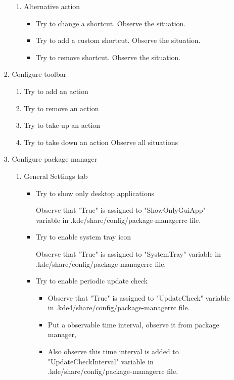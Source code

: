\documentclass[a4paper,10pt]{article}
\begin{document}
\begin{enumerate}
\begin{enumerate}
\begin{enumerate}
\begin{enumerate}
                \item Alternative action
                \begin{itemize}
                    \item Try to change a shortcut. Observe the situation.
                    \item Try to add a custom shortcut. Observe the situation.
                    \item Try to remove shortcut. Observe the situation.
                \end{itemize}
            \end{enumerate}
            \item Configure toolbar
            \begin{enumerate}
                \item Try to add an action 
                \item Try to remove an action
                \item Try to take up an action
                \item Try to take down an action
                Observe all situations
            \end{enumerate}
            \item Configure package manager
            \begin{enumerate}
                \item General Settings tab
                \begin{itemize}
                    \item Try to show only desktop applications

                    Observe that "True" is assigned to "ShowOnlyGuiApp" variable in .kde/share/config/package-managerrc file.

                    \item Try to enable system tray icon

                    Observe that "True" is assigned to "SystemTray" variable in .kde/share/config/package-managerrc file.

                    \item Try to enable periodic update check
                    \begin{itemize}
                        \item Observe that "True" is assigned to "UpdateCheck" variable in .kde4/share/config/package-managerrc file.
                        \item Put a observable time interval, observe it from package manager,
                        \item Also observe this time interval is added to "UpdateCheckInterval" variable in .kde/share/config/package-managerrc file.
                    \end{itemize}


\end{itemize}
\end{enumerate}
\end{enumerate}
\end{enumerate}
\end{enumerate}
\end{document}
